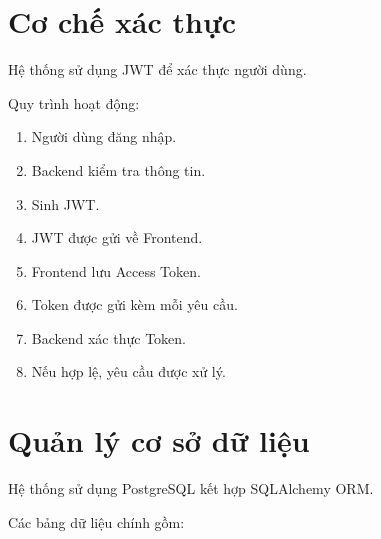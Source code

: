 
\section{Cơ chế xác thực}

Hệ thống sử dụng JWT để xác thực người dùng.

Quy trình hoạt động:

\begin{enumerate}

\item Người dùng đăng nhập.

\item Backend kiểm tra thông tin.

\item Sinh JWT.

\item JWT được gửi về Frontend.

\item Frontend lưu Access Token.

\item Token được gửi kèm mỗi yêu cầu.

\item Backend xác thực Token.

\item Nếu hợp lệ, yêu cầu được xử lý.

\end{enumerate}


\section{Quản lý cơ sở dữ liệu}

Hệ thống sử dụng PostgreSQL kết hợp SQLAlchemy ORM.

Các bảng dữ liệu chính gồm:

